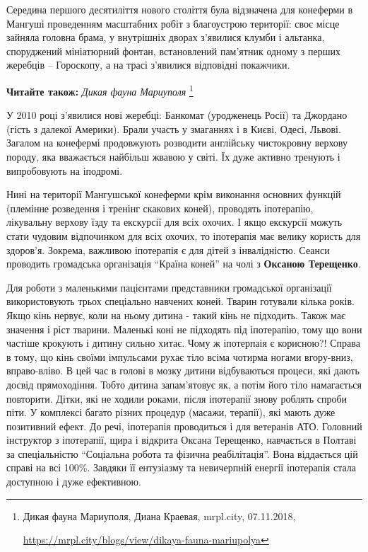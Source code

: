 
Середина першого десятиліття нового століття була відзначена для конеферми в
Мангуші проведенням масштабних робіт з благоустрою території: своє місце
зайняла головна брама, у внутрішніх дворах з'явилися клумби і альтанка,
споруджений мініатюрний фонтан, встановлений пам'ятник одному з перших жеребців
– Гороскопу, а на трасі з'явилися відповідні покажчики.

\textbf{Читайте також:} \emph{Дикая фауна Мариуполя}%
\footnote{Дикая фауна Мариуполя, Диана Краевая, mrpl.city, 07.11.2018, \par%
\url{https://mrpl.city/blogs/view/dikaya-fauna-mariupolya}
}

У 2010 році з'явилися нові жеребці: Банкомат (уродженець Росії) та Джордано
(гість з далекої Америки). Брали участь у змаганнях і в Києві, Одесі, Львові.
Загалом на конефермі продовжують розводити англійську чистокровну верхову
породу, яка вважається найбільш жвавою у світі. Їх дуже активно тренують і
випробовують на іподромі. 


Нині на території Мангушської конеферми крім
виконання основних функцій (племінне розведення і тренінг скакових коней),
проводять іпотерапію, лікувальну верхову їзду та екскурсії для всіх охочих. І
якщо екскурсії можуть стати чудовим відпочинком для всіх охочих, то іпотерапія
має велику користь для здоров'я. Зокрема, важливою іпотерапія є для дітей з
інвалідністю. Сеанси проводить громадська організація \enquote{Країна коней} на чолі з
\textbf{Оксаною Терещенко}.


Для роботи з маленькими пацієнтами представники громадської організації
використовують трьох спеціально навчених коней. Тварин готували кілька років.
Якщо кінь нервує, коли на ньому дитина - такий кінь не підходить. Також має
значення і ріст тварини. Маленькі коні не підходять під іпотерапію, тому що
вони частіше крокують і дитину сильно хитає. Чому ж іпотерпаія є корисною?!
Справа в тому, що кінь своїми імпульсами рухає тіло всіма чотирма ногами
вгору-вниз, вправо-вліво. В цей час в голові в мозку дитини відбуваються
процеси, які дають досвід прямоходіння. Тобто дитина запам’ятовує як, а потім
його тіло намагається повторити. Дітки, які не ходили роками, після іпотерапії
знову роблять спроби піти. У комплексі багато різних процедур (масажи,
терапії), які мають дуже позитивний ефект. До речі, іпотерапія проводиться і
для ветеранів АТО. Головний інструктор з іпотерапії, щира і відкрита Оксана
Терещенко, навчається в Полтаві за спеціальністю \enquote{Соціальна робота та фізична
реабілітація}. Вона віддається цій справі на всі 100\%. Завдяки її ентузіазму та
невичерпній енергії іпотерапія стала доступною і дуже ефективною.

